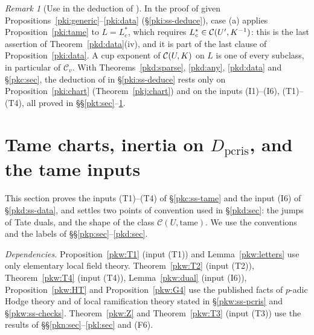 \documentclass[10pt]{amsart}
\theoremstyle{definition}
\theoremstyle{remark}
\newtheorem{remark}[theorem]{Remark}
\newcommand{\Q}{\mathbb Q}
\begin{document}
\begin{remark}[Use in the deduction of {\cite[Theorem~5.8]{P55}}]\label{pkd:rem-deduce}
In the proof of {\cite[Theorem~5.8]{P55}} given Propositions~\ref{pki:generic}--\ref{pki:data}
(\S\ref{pki:ss-deduce}), case (a) applies Proposition~\ref{pki:tame} to $L=L_c^*$, which requires
$L_c^*\in\pkiC(U',K^{-1})$: this is the last assertion of Theorem~\ref{pkd:data}(iv), and it is part of the last clause of
Proposition~\ref{pki:data}. A cup exponent of
$\pkiC(U,K)$ on $L$ is one of every subclass, in particular of $\mathcal C_v$. With
Theorems~\ref{pkd:sparse}, \ref{pkd:any}, \ref{pkd:data} and \S\ref{pkc:sec}, the deduction of
{\cite[Theorem~5.8]{P55}} in \S\ref{pki:ss-deduce} rests only on Proposition~\ref{pki:chart} (Theorem~\ref{pkj:chart}) and on the
inputs (I1)--(I6), (T1)--(T4), all proved in \S\S\ref{pkt:sec}--\ref{pkw:sec}.
\end{remark}



\providecommand{\auO}{\mathcal O}
\providecommand{\auQlb}{\overline{\Q}_\ell}
\providecommand{\pkpA}{A_{\mathrm{inf}}}
\providecommand{\pkpW}{W(C^\flat)}
\providecommand{\pkpAmb}{\mathbb A}
\providecommand{\pkmJ}[3]{J^{#1}_{#2}(#3)}
\providecommand{\pkmI}[2]{I_{#1}(#2)}
\providecommand{\pkiC}{\mathcal C}
\providecommand{\pkwB}{B_{\mathrm{cris}}}
\providecommand{\pkwD}{D_{\mathrm{pcris}}}
\providecommand{\pkwur}{\Q_\ell^{\mathrm{ur}}}
\providecommand{\pkwI}{I_{\Q_\ell}}

\section{Tame charts, inertia on $D_{\mathrm{pcris}}$, and the tame inputs}\label{pkw:sec}

This section proves the inputs (T1)--(T4) of \S\ref{pkc:ss-tame} and the input (I6) of
\S\ref{pkd:ss-data}, and settles two points of convention used in \S\ref{pkd:sec}: the jumps of
Tate duals, and the shape of the class $\mathcal C(U,\mathrm{tame})$. We use the conventions and the
labels of \S\S\ref{pkp:sec}--\ref{pkd:sec}.

\emph{Dependencies.} Proposition~\ref{pkw:T1} (input (T1)) and Lemma~\ref{pkw:letters} use only
elementary local field theory. Theorem~\ref{pkw:T2} (input (T2)), Theorem~\ref{pkw:T4} (input (T4)),
Lemma~\ref{pkw:dual} (input (I6)), Proposition~\ref{pkw:HT} and Proposition~\ref{pkw:G4} use the published facts
of $p$-adic Hodge theory and of local ramification theory stated in \S\ref{pkw:ss-pcris} and
\S\ref{pkw:ss-checks}. Theorem~\ref{pkw:Z} and Theorem~\ref{pkw:T3} (input (T3)) use the results of
\S\S\ref{pkn:sec}--\ref{pkl:sec} and (F6).
\end{document}
